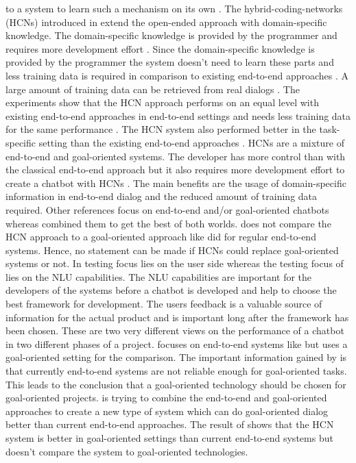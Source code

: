 to a system to learn such a mechanism on its own \cite{williams2017hybrid}.
The hybrid-coding-networks (HCNs) introduced in \citet{williams2017hybrid} extend the open-ended approach 
with domain-specific knowledge. 
The domain-specific knowledge is provided by the programmer and requires more development effort \cite{williams2017hybrid}.
Since the domain-specific knowledge is provided by the programmer the system doesn't need to learn these parts and less training data is required in comparison to existing end-to-end approaches \cite{williams2017hybrid}.
A large amount of training data can be retrieved from real dialogs \cite{williams2017hybrid}.
The experiments show that the HCN approach performs on an equal level with existing end-to-end approaches in end-to-end settings and needs less training data for the same performance \cite{williams2017hybrid}. 
The HCN system also performed better in the task-specific setting than the existing end-to-end approaches \cite{williams2017hybrid}.
HCNs are a mixture of end-to-end and goal-oriented systems.
The developer has more control than with the classical end-to-end approach but 
it also requires more development effort to create a chatbot with HCNs \cite{williams2017hybrid}.
The main benefits are the usage of domain-specific information in end-to-end dialog 
and the reduced amount of training data required.
Other references focus on end-to-end and/or goal-oriented chatbots whereas \citet{williams2017hybrid} combined them to get the best of both worlds.
\citet{williams2017hybrid} does not compare the HCN approach to a goal-oriented approach like \citet{bordes2016learning} did
for regular end-to-end systems.
Hence, no statement can be made if HCNs could replace goal-oriented systems or not.
In \citet{evaluateChatbotsShawar2007} testing focus lies on the user side whereas the testing focus of 
\citet{braunEvaluatingNLU} lies on the NLU capabilities.
The NLU capabilities are important for the developers of the systems before a chatbot
is developed and help to choose the best framework for development.
The users feedback is a valuable source of information for the actual product and
is important long after the framework has been chosen.
These are two very different views on the performance of a chatbot in two different phases of a project.
\citet{bordes2016learning} focuses on end-to-end systems like \citet{evaluateChatbotsShawar2007, williams2017hybrid}
but uses a goal-oriented setting for the comparison.
The important information gained by \citet{bordes2016learning} is that currently end-to-end systems 
are not reliable enough for goal-oriented tasks.
This leads to the conclusion that a goal-oriented technology should be chosen for goal-oriented 
projects.
\citet{williams2017hybrid} is trying to combine the end-to-end and goal-oriented approaches to 
create a new type of system which can do goal-oriented dialog better than current end-to-end
approaches. 
The result of \citet{williams2017hybrid} shows that the HCN system is better in goal-oriented 
settings than current end-to-end systems but doesn't compare the system to goal-oriented technologies.

